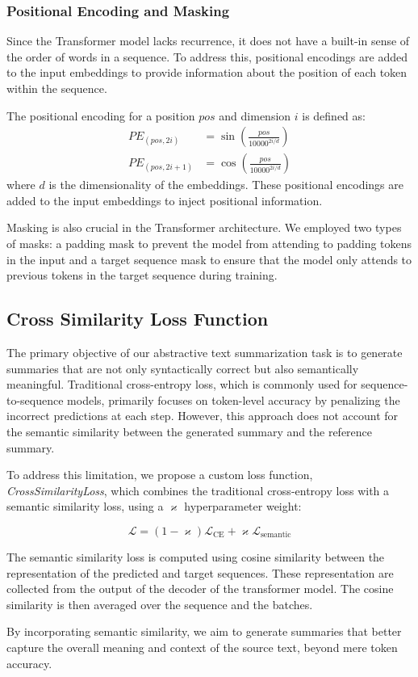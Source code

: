 \subsubsection{Positional Encoding and Masking}

Since the Transformer model lacks recurrence, it does not have a built-in sense of the order of words in a sequence. To address this, positional encodings are added to the input embeddings to provide information about the position of each token within the sequence.

The positional encoding for a position \(pos\) and dimension \(i\) is defined as:
\begin{equation}
	\begin{aligned}
		PE_{(pos, 2i)} &= \sin\left(\frac{pos}{10000^{2i/d}}\right) \\
		PE_{(pos, 2i+1)} &= \cos\left(\frac{pos}{10000^{2i/d}}\right)
	\end{aligned}
\end{equation}
where \(d\) is the dimensionality of the embeddings. These positional encodings are added to the input embeddings to inject positional information.

Masking is also crucial in the Transformer architecture. We employed two types of masks: a padding mask to prevent the model from attending to padding tokens in the input and a target sequence mask to ensure that the model only attends to previous tokens in the target sequence during training.


\subsection{Cross Similarity Loss Function}
The primary objective of our abstractive text summarization task is to generate summaries that are not only syntactically correct but also semantically meaningful. Traditional cross-entropy loss, which is commonly used for sequence-to-sequence models, primarily focuses on token-level accuracy by penalizing the incorrect predictions at each step. However, this approach does not account for the semantic similarity between the generated summary and the reference summary.

To address this limitation, we propose a custom loss function, \textit{CrossSimilarityLoss}, which combines the traditional cross-entropy loss\cite{CrossEnrtopyLoss} with a semantic similarity loss, using a $\varkappa$ hyperparameter weight:

\begin{equation}
    \mathcal{L} = (1 - \varkappa) \mathcal{L}_{\text{CE}} + \varkappa \mathcal{L}_{\text{semantic}}
\end{equation}

The semantic similarity loss is computed using cosine similarity\cite{cosineSimilarity} between the representation of the predicted and target sequences. These representation are collected from the output of the decoder of the transformer model. The cosine similarity is then averaged over the sequence and the batches.

By incorporating semantic similarity, we aim to generate summaries that better capture the overall meaning and context of the source text, beyond mere token accuracy.

